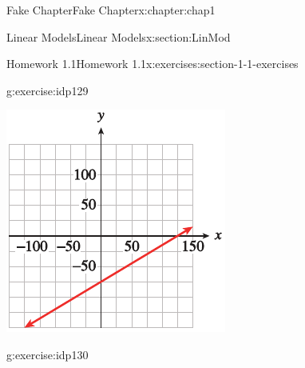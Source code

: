 \documentclass[oneside,10pt,]{book}
\numberwithin{equation}{section}
\begin{document}
\begin{chapterptx}{Fake Chapter}{}{Fake Chapter}{}{}{x:chapter:chap1}
\begin{sectionptx}{Linear Models}{}{Linear Models}{}{}{x:section:LinMod}
\begin{exercises-subsection}{Homework 1.1}{}{Homework 1.1}{}{}{x:exercises:section-1-1-exercises}
\begin{exercisegroupcol}{2}
\begin{divisionexerciseegcol}{34}{}{}{g:exercise:idp129}
\begin{sidebyside}{1}{0.1}{0.1}{0}
\begin{sbspanel}{0.8}%
\includegraphics[width=\linewidth]{external/photos/fig-ex-1-1-34.pdf}
\end{sbspanel}%
\end{sidebyside}%
\end{divisionexerciseegcol}%
\begin{divisionexerciseegcol}{35}{}{}{g:exercise:idp130}%
\begin{sidebyside}{1}{0.1}{0.1}{0}%
\begin{sbspanel}{0.8}%

\end{sbspanel}
\end{sidebyside}
\end{divisionexerciseegcol}
\end{exercisegroupcol}
\end{exercises-subsection}
\end{sectionptx}
\end{chapterptx}
\end{document}
